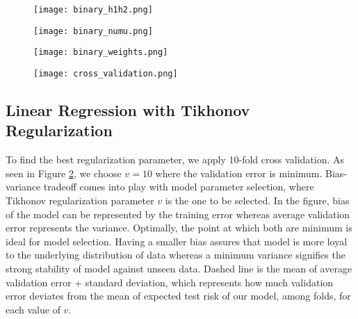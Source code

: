 \documentclass[10pt]{article}
\begin{document}
\begin{figure}[H]
\centering
\begin{minipage}{.48\linewidth}
  \centering
  \texttt{[image: binary\_h1h2.png]}
  \label{binary_h1h2}
\end{minipage}
\hspace{.03\textwidth}%
\begin{minipage}{.48\linewidth}
  \centering
  \texttt{[image: binary\_numu.png]}
  \label{binary_numu}
\end{minipage}
\end{figure}

\begin{figure}[H]
\centering
\begin{minipage}{.48\textwidth}
  \centering
\texttt{[image: binary\_weights.png]}
\label{binary_weights}
\end{minipage}
\hspace{.03\textwidth}%
\begin{minipage}{.48\textwidth}
  \centering
\texttt{[image: cross\_validation.png]}
\label{cv}
\end{minipage}
\end{figure}

\subsection{Linear Regression with Tikhonov Regularization}
To find the best regularization parameter, we apply 10-fold cross validation. As seen in Figure \ref{cv}, we choose $v=10$ where the validation error is minimum. Bias-variance tradeoff comes into play with model parameter selection, where Tikhonov regularization parameter $v$ is the one to be selected. In the figure, bias of the model can be represented by the training error whereas average validation error represents the variance. Optimally, the point at which both are minimum is ideal for model selection. Having a smaller bias assures that model is more loyal to the underlying distribution of data whereas a minimum variance signifies the strong stability of model against unseen data. Dashed line is the mean of average validation error + standard deviation, which represents how much validation error deviates from the mean of expected test risk of our model, among folds, for each value of $v$. 
\end{document}

